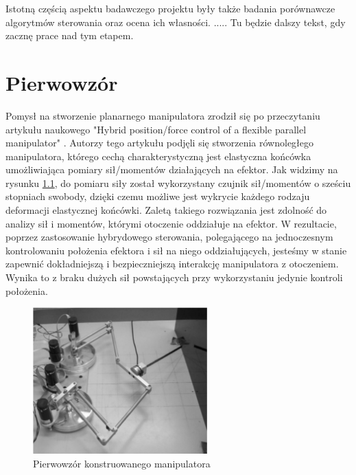 \documentclass[printmode]{mgr}
\begin{document}
Istotną częścią aspektu badawczego projektu były także badania porównawcze algorytmów sterowania oraz ocena ich własności.
.....
Tu będzie dalszy tekst, gdy zacznę prace nad tym etapem.


\chapter{Pierwowzór} \label{ch:pierwowzor}
Pomysł na stworzenie planarnego manipulatora zrodził się po przeczytaniu artykułu naukowego
"Hybrid position/force control of a flexible parallel manipulator" \cite{wzor}. 
Autorzy tego artykułu podjęli się stworzenia równoległego manipulatora, którego cechą charakterystyczną
jest elastyczna końcówka umożliwiająca pomiary sił/momentów działających na efektor. 
Jak widzimy na rysunku \ref{rys:pierwowzor_zdjecie}, do pomiaru siły został wykorzystany czujnik sił/momentów
o sześciu stopniach swobody, dzięki czemu możliwe jest wykrycie każdego rodzaju deformacji elastycznej
końcówki. Zaletą takiego rozwiązania jest zdolność do analizy sił i momentów, którymi otoczenie
oddziałuje na efektor. W rezultacie, poprzez zastosowanie hybrydowego sterowania, polegającego
na jednoczesnym kontrolowaniu położenia efektora i sił na niego oddziałujących, jesteśmy w stanie zapewnić
dokładniejszą i bezpieczniejszą interakcję manipulatora z otoczeniem. Wynika to z braku dużych sił powstających
przy wykorzystaniu jedynie kontroli położenia.
\begin{figure}[tp]
\centering
  \includegraphics[width=0.6\textwidth]{grafika/pierwowzor_zdjecie}
  \caption{Pierwowzór konstruowanego manipulatora}
  \label{rys:pierwowzor_zdjecie}  
\end{figure}
\end{document}
